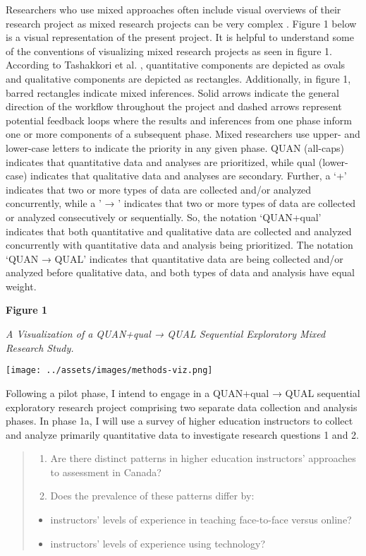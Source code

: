 \documentclass[
]{book}
\providecommand{\tightlist}{%
  \setlength{\itemsep}{0pt}\setlength{\parskip}{0pt}}
\begin{document}
\hspace{0pt} Researchers who use mixed approaches often include visual overviews of their research project as mixed research projects can be very complex \citep{creamerIntroductionFullyIntegrated2018}. Figure 1 below is a visual representation of the present project. It is helpful to understand some of the conventions of visualizing mixed research projects as seen in figure 1. According to Tashakkori et al. \citeyearpar{tashakkoriFoundationsMixedMethods2020}, quantitative components are depicted as ovals and qualitative components are depicted as rectangles. Additionally, in figure 1, barred rectangles indicate mixed inferences. Solid arrows indicate the general direction of the workflow throughout the project and dashed arrows represent potential feedback loops where the results and inferences from one phase inform one or more components of a subsequent phase. Mixed researchers use upper- and lower-case letters to indicate the priority in any given phase. QUAN (all-caps) indicates that quantitative data and analyses are prioritized, while qual (lower-case) indicates that qualitative data and analyses are secondary. Further, a `+' indicates that two or more types of data are collected and/or analyzed concurrently, while a ' → ' indicates that two or more types of data are collected or analyzed consecutively or sequentially. So, the notation `QUAN+qual' indicates that both quantitative and qualitative data are collected and analyzed concurrently with quantitative data and analysis being prioritized. The notation `QUAN → QUAL' indicates that quantitative data are being collected and/or analyzed before qualitative data, and both types of data and analysis have equal weight.

\textbf{Figure 1}

\emph{A Visualization of a QUAN+qual → QUAL Sequential Exploratory Mixed Research Study.}

\texttt{[image: ../assets/images/methods-viz.png]}

Following a pilot phase, I intend to engage in a QUAN+qual → QUAL sequential exploratory research project comprising two separate data collection and analysis phases. In phase 1a, I will use a survey of higher education instructors to collect and analyze primarily quantitative data to investigate research questions 1 and 2.

\begin{quote}
\begin{enumerate}
\def\labelenumi{\arabic{enumi}.}
\tightlist
\item
  Are there distinct patterns in higher education instructors' approaches to assessment in Canada?
\item
  Does the prevalence of these patterns differ by:
\end{enumerate}

\begin{itemize}
\tightlist
\item
  instructors' levels of experience in teaching face-to-face versus online?
\item
  instructors' levels of experience using technology?
\end{itemize}
\end{quote}
\end{document}
